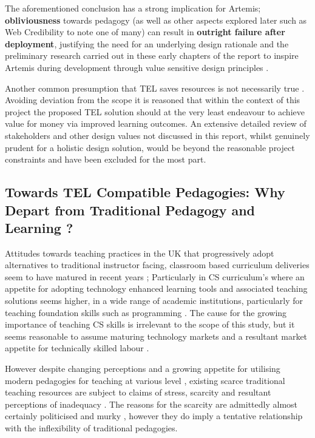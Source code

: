 The aforementioned conclusion has a strong implication for Artemis; \textbf{obliviousness} towards pedagogy (as well as other aspects explored later such as Web Credibility to note one of many) can result in \textbf{outright failure after deployment}, justifying the need for an underlying design rationale and the preliminary research carried out in these early chapters of the report to inspire Artemis during development through value sensitive design principles \cite{Mahamuni2015}.

Another common presumption that TEL saves resources is not necessarily true \cite{Gordon2014,Hackelbusch2007}. Avoiding deviation from the scope it is reasoned that within the context of this project the proposed TEL solution should at the very least endeavour to achieve value for money via improved learning outcomes. An extensive detailed review of stakeholders and other design values not discussed in this report, whilst genuinely prudent for a holistic design solution, would be beyond the reasonable project constraints and have been excluded for the most part.



\label{sec:sec01}
\subsection{Towards TEL Compatible Pedagogies: Why Depart from Traditional Pedagogy and Learning ?}
\label{subsec:subsec01}

Attitudes towards teaching practices in the UK that progressively adopt alternatives to traditional instructor facing, classroom based curriculum deliveries seem to have matured in recent years \cite{Jessica2012,CinYeeHoo,Stuart2014}; Particularly in CS curriculum's where an appetite for adopting technology enhanced learning tools and associated teaching solutions seems higher, in a wide range of academic institutions, particularly for teaching  foundation  skills such as programming \cite{Ibanez2014,Serrano-Laguna2015,Bittencourt2015,Chigona2008,CinYeeHoo,Jessica2012,Stuart2014}. The cause for the growing importance of teaching CS skills is irrelevant to the scope of this study, but it seems reasonable to assume  maturing technology markets and  a resultant market appetite for technically skilled labour \cite{CinYeeHoo,Stuart2014,Jessica2012}.

However despite changing perceptions and a growing appetite for utilising modern pedagogies for teaching at various level \cite{Chigona2008,CinYeeHoo}, existing scarce traditional teaching resources are subject to claims of stress, scarcity and  resultant perceptions of inadequacy \cite{CinYeeHoo}. The reasons for the scarcity are admittedly almost certainly politicised and murky \cite{Stuart2014,CinYeeHoo,Jessica2012}, however they do imply a tentative relationship with the inflexibility of traditional pedagogies.

